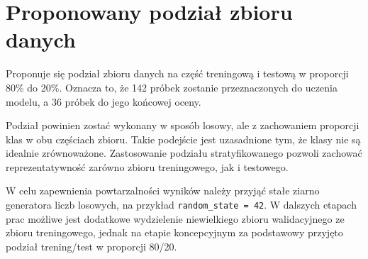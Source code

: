 \section{Proponowany podział zbioru danych}

Proponuje się podział zbioru danych na część treningową i testową w proporcji 80\% do 20\%. Oznacza to, że 142 próbek zostanie przeznaczonych do uczenia modelu, a 36 próbek do jego końcowej oceny.

Podział powinien zostać wykonany w sposób losowy, ale z zachowaniem proporcji klas w obu częściach zbioru. Takie podejście jest uzasadnione tym, że klasy nie są idealnie zrównoważone. Zastosowanie podziału stratyfikowanego pozwoli zachować reprezentatywność zarówno zbioru treningowego, jak i testowego.

W celu zapewnienia powtarzalności wyników należy przyjąć stałe ziarno generatora liczb losowych, na przykład \texttt{random\_state = 42}. W dalszych etapach prac możliwe jest dodatkowe wydzielenie niewielkiego zbioru walidacyjnego ze zbioru treningowego, jednak na etapie koncepcyjnym za podstawowy przyjęto podział trening/test w proporcji 80/20.
